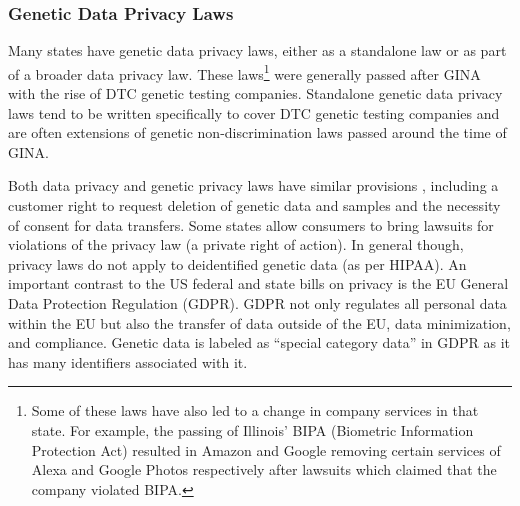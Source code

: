 \subsubsection{Genetic Data Privacy Laws}

Many states have genetic data privacy laws, either as a standalone law or as part of a broader data privacy law. These laws\footnote{Some of these laws have also led to a change in company services in that state. For example, the passing of Illinois' BIPA (Biometric Information Protection Act) resulted in Amazon and Google removing certain services of Alexa and Google Photos respectively after lawsuits which claimed that the company violated BIPA.} were generally passed after GINA with the rise of DTC genetic testing companies. Standalone genetic data privacy laws tend to be written specifically to cover DTC genetic testing companies and are often extensions of genetic non-discrimination laws passed around the time of GINA.

Both data privacy and genetic privacy laws have similar provisions \cite{nhgri_genome_database_2025}, including a customer right to request deletion of genetic data and samples and the necessity of consent for data transfers. Some states allow consumers to bring lawsuits for violations of the privacy law (a private right of action). In general though, privacy laws do not apply to deidentified genetic data (as per HIPAA). An important contrast to the US federal and state bills on privacy is the EU General Data Protection Regulation (GDPR). GDPR not only regulates all personal data within the EU but also the transfer of data outside of the EU, data minimization, and compliance. Genetic data is labeled as ``special category data'' in GDPR as it has many identifiers associated with it. 




